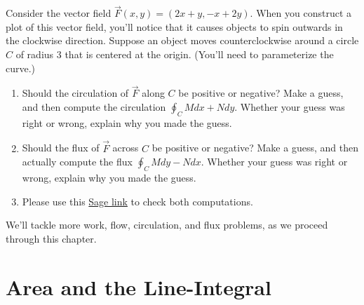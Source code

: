 \begin{problem}
%
 Consider the vector field $\vec F(x,y) = (2x+y,-x+2y)$. When you construct a plot of this vector field, you'll notice that it causes objects to spin outwards in the clockwise direction. Suppose an object moves counterclockwise around a circle $C$ of radius 3 that is centered at the origin. (You'll need to parameterize the curve.)
\begin{enumerate}
 \item Should the circulation of $\vec F$ along $C$ be positive or negative?  Make a guess, and then compute the circulation $\oint_C Mdx+Ndy$. Whether your guess was right or wrong, explain why you made the guess. 
 \item Should the flux of $\vec F$ across $C$ be positive or negative? Make a guess, and then actually compute the flux $\oint_C Mdy-Ndx$. Whether your guess was right or wrong, explain why you made the guess. 
 \item Please use this \href{\sageworkfluxurl}{Sage link} to check both computations. 
\end{enumerate}
\end{problem}

We'll tackle more work, flow, circulation, and flux problems, as we proceed through this chapter.

\newpage
\uday
\normalsize

\section{Area and the Line-Integral}


